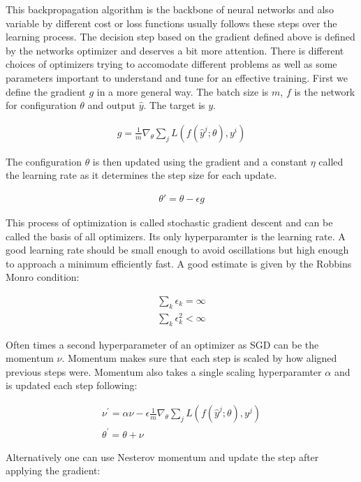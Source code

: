 This backpropagation algorithm is the backbone of neural networks and also variable by different cost or loss functions usually follows these steps over the learning process. The decision step based on the gradient defined above is defined by the networks optimizer and deserves a bit more attention. There is different choices of optimizers trying to accomodate different problems as well as some parameters important to understand and tune for an effective training. First we define the gradient $g$ in a more general way. The batch size is $m$, $f$ is the network for configuration $\theta$ and output $\hat{y}$. The target is $y$.

\begin{align}
    g = \frac{1}{m} \nabla_{\theta} \sum_j L(f(\hat{y}^j; \theta), y^i)
\end{align}

The configuration $\theta$ is then updated using the gradient and a constant $\eta$ called the learning rate as it determines the step size for each update.

\begin{align}
    \theta \prime = \theta - \epsilon g
\end{align}

This process of optimization is called stochastic gradient descent and can be called the basis of all optimizers. Its only hyperparamter is the learning rate. A good learning rate should be small enough to avoid oscillations but high enough to approach a minimum efficiently fast. A good estimate is given by the Robbins Monro condition:

\begin{align}
    \sum_k \epsilon_k = \infty\\
    \sum_k \epsilon_k^2 < \infty
\end{align}

Often times a second hyperparameter of an optimizer as SGD can be the momentum $\nu$. Momentum makes sure that each step is scaled  by how aligned previous steps were. Momentum also takes a single scaling hyperparamter $\alpha$ and is updated each step following:

\begin{align}
    \nu^{\prime} = \alpha \nu - \epsilon \frac{1}{m} \nabla_{\theta} \sum_j L(f(\hat{y}^j; \theta), y^j)\\
    \theta^{\prime} = \theta + \nu
\end{align}

Alternatively one can use Nesterov momentum and update the step after applying the gradient:

